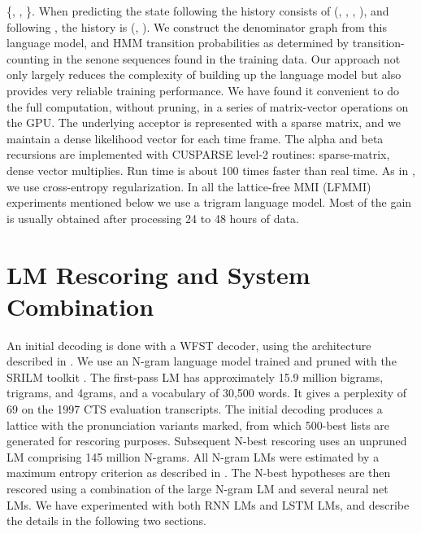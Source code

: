 \documentclass{article}
\begin{document}
\{, , \}.
When predicting the state following  the history consists of
(, , , ),
and following , the history is (, ).
We construct the denominator graph from this language model, and HMM transition
probabilities as determined by transition-counting in the 
senone sequences found in the training data. Our approach not only largely reduces 
the complexity of building up the language model but also provides 
very reliable training performance. 
We have found it convenient to do the full computation, without pruning, in a series of matrix-vector
operations on the GPU. The underlying acceptor is represented with a 
sparse matrix, and we maintain a dense likelihood vector for each time
frame. The alpha and beta recursions are implemented with CUSPARSE level-2
routines: sparse-matrix, dense vector multiplies. Run time is about 100 times
faster than real time.
As in \cite{povey2016purely}, we use 
cross-entropy regularization. 
In all the lattice-free MMI (LFMMI) experiments mentioned below we use a trigram language model.
Most of the gain is usually obtained after processing 24 to 48 hours of data.
\section{LM Rescoring and System Combination}
\label{sec:rescoring}
An initial decoding is done with a WFST decoder, 
using the architecture described in \cite{mendis2016parallelizing}.
We use an N-gram language model trained and pruned with the SRILM toolkit \cite{stolcke2002srilm}.
The first-pass LM has approximately 15.9 million bigrams, trigrams, and 4grams, and a vocabulary of 30,500 words.
It gives a perplexity of 69 on the 1997 CTS evaluation transcripts.
The initial decoding produces a lattice with the pronunciation variants
marked, from which 500-best lists are generated for rescoring purposes.
Subsequent N-best rescoring uses an unpruned LM comprising 145 million N-grams.
All N-gram LMs were estimated by a maximum entropy criterion as
described in \cite{AlumaeKurimo:interspeech2012}.
The N-best hypotheses are then rescored using a combination of the large N-gram LM and several 
neural net LMs. We have experimented with both RNN LMs and LSTM LMs, 
and describe the details in the following two sections.
\end{document}
